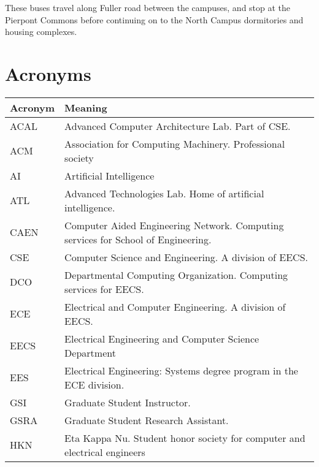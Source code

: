\documentclass[11pt]{article}
\begin{document}
These buses travel along Fuller road between the campuses, and stop at
the Pierpont Commons before continuing on to the North Campus
dormitories and housing complexes.
\section{Acronyms}
\label{sec-14}


\begin{center}
\begin{tabular}{ll}
\hline
\hline
 \textbf{Acronym}  &  \textbf{Meaning}                                                                    \\
\hline
 ACAL              &  Advanced Computer Architecture Lab.  Part of CSE.                                   \\
 ACM               &  Association for Computing Machinery.  Professional society                          \\
 AI                &  Artificial Intelligence                                                             \\
 ATL               &  Advanced Technologies Lab.  Home of artificial intelligence.                        \\
 CAEN              &  Computer Aided Engineering Network.  Computing services for School of Engineering.  \\
 CSE               &  Computer Science and Engineering.  A division of EECS.                              \\
 DCO               &  Departmental Computing Organization.  Computing services for EECS.                  \\
 ECE               &  Electrical and Computer Engineering.  A division of EECS.                           \\
 EECS              &  Electrical Engineering and Computer Science Department                              \\
 EES               &  Electrical Engineering: Systems degree program in the ECE division.                 \\
 GSI               &  Graduate Student Instructor.                                                        \\
 GSRA              &  Graduate Student Research Assistant.                                                \\
 HKN               &  Eta Kappa Nu.  Student honor society for computer and electrical engineers          \\

\end{tabular}
\end{center}
\end{document}
